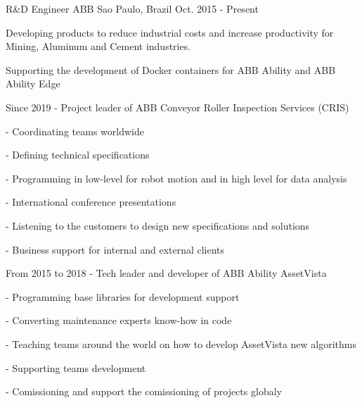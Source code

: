 

\begin{cventries}

  \cventry
    {R\&D Engineer} %
    {ABB} %
    {Sao Paulo, Brazil} %
    {Oct. 2015 - Present} %
    {
      \begin{cvitems} %
        \item {Developing products to reduce industrial costs and increase productivity for Mining, Aluminum and Cement industries.}
        \item {Supporting the development of Docker containers for ABB Ability and ABB Ability Edge}
        \item {Since 2019 - Project leader of ABB Conveyor Roller Inspection Services (CRIS)}
        \item {- Coordinating teams worldwide} 
        \item {- Defining technical specifications} 
        \item {- Programming in low-level for robot motion and in high level for data analysis} 
        \item {- International conference presentations} 
        \item {- Listening to the customers to design new specifications and solutions} 
        \item {- Business support for internal and external clients} 
        \item {From 2015 to 2018 - Tech leader and developer of ABB Ability AssetVista}
        \item {- Programming base libraries for development support} 
        \item {- Converting maintenance experts know-how in code} 
        \item {- Teaching teams around the world on how to develop AssetVista new algorithms} 
        \item {- Supporting teams development} 
        \item {- Comissioning and support the comissioning of projects globaly} 
      \end{cvitems}
    }


\end{cventries}
